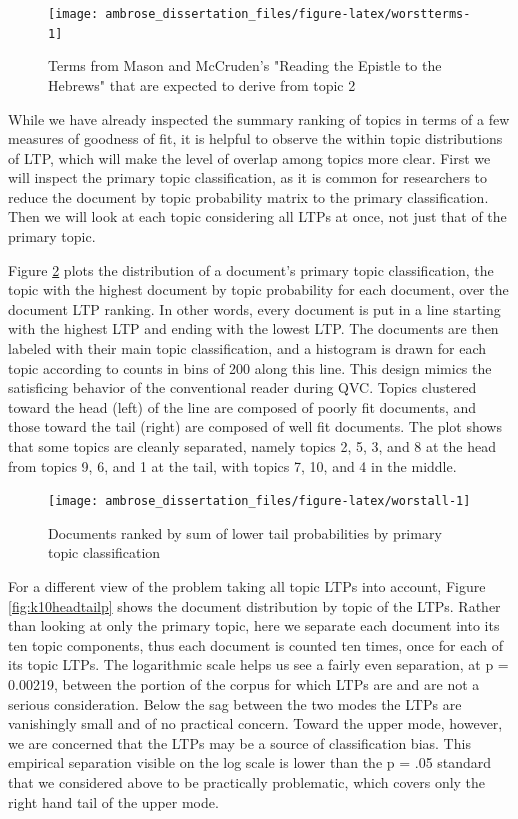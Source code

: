 \documentclass[]{book}
\theoremstyle{definition}
\theoremstyle{definition}
\theoremstyle{definition}
\theoremstyle{remark}
\begin{document}
\begin{figure}

{\centering \texttt{[image: ambrose\_dissertation\_files/figure-latex/worstterms-1]} 

}

\caption{Terms from Mason and McCruden's "Reading the Epistle to the Hebrews" that are expected to derive from topic 2}\label{fig:worstterms}
\end{figure}

While we have already inspected the summary ranking of topics in terms
of a few measures of goodness of fit, it is helpful to observe the
within topic distributions of LTP, which will make the level of overlap
among topics more clear. First we will inspect the primary topic
classification, as it is common for researchers to reduce the document
by topic probability matrix to the primary classification. Then we will
look at each topic considering all LTPs at once, not just that of the
primary topic.

Figure \ref{fig:worstall} plots the distribution of a document's primary
topic classification, the topic with the highest document by topic
probability for each document, over the document LTP ranking. In other
words, every document is put in a line starting with the highest LTP and
ending with the lowest LTP. The documents are then labeled with their
main topic classification, and a histogram is drawn for each topic
according to counts in bins of 200 along this line. This design mimics
the satisficing behavior of the conventional reader during QVC. Topics
clustered toward the head (left) of the line are composed of poorly fit
documents, and those toward the tail (right) are composed of well fit
documents. The plot shows that some topics are cleanly separated, namely
topics 2, 5, 3, and 8 at the head from topics 9, 6, and 1 at the tail,
with topics 7, 10, and 4 in the middle.

\begin{figure}

{\centering \texttt{[image: ambrose\_dissertation\_files/figure-latex/worstall-1]} 

}

\caption{Documents ranked by sum of lower tail probabilities by primary topic classification}\label{fig:worstall}
\end{figure}

For a different view of the problem taking all topic LTPs into account,
Figure \ref{fig:k10headtailp} shows the document distribution by topic
of the LTPs. Rather than looking at only the primary topic, here we
separate each document into its ten topic components, thus each document
is counted ten times, once for each of its topic LTPs. The logarithmic
scale helps us see a fairly even separation, at p = 0.00219, between the
portion of the corpus for which LTPs are and are not a serious
consideration. Below the sag between the two modes the LTPs are
vanishingly small and of no practical concern. Toward the upper mode,
however, we are concerned that the LTPs may be a source of
classification bias. This empirical separation visible on the log scale
is lower than the p = .05 standard that we considered above to be
practically problematic, which covers only the right hand tail of the
upper mode.
\end{document}
